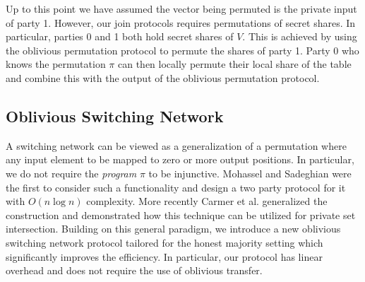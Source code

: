 Up to this point we have assumed the vector being permuted is the private input of party 1. However, our join protocols requires permutations of secret shares. In particular, parties 0 and 1 both hold secret shares of $V$. This is achieved by using the oblivious permutation protocol to permute the shares of party 1. Party 0 who knows the permutation $\pi$ can then locally permute their local share of the table and combine this with the output of the oblivious permutation protocol.



\subsection{Oblivious Switching Network}

A switching network\cite{MS13} can be viewed as a generalization of a permutation where any input element to be mapped to zero or more output positions. In particular, we do not require the \emph{program} $\pi$ to be injunctive. Mohassel and Sadeghian \cite{MS13} were the first to consider such a functionality and design a two party protocol for it with $O(n\log n)$ complexity. More recently Carmer et al. \cite{CMRS18} generalized the construction and demonstrated how this technique can be utilized for private set intersection. Building on this general paradigm, we introduce a new oblivious switching network protocol tailored for the honest majority setting which significantly improves the efficiency. In particular, our protocol has linear overhead and does not require the use of oblivious transfer.

